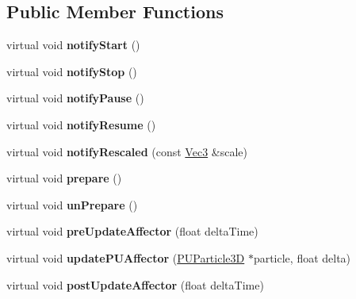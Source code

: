 \subsection*{Public Member Functions}
\begin{DoxyCompactItemize}
\item 
\mbox{\label{classPUAffector_ac9a6b7facaa01a91682c7f5ef2640e29}} 
virtual void {\bfseries notify\+Start} ()
\item 
\mbox{\label{classPUAffector_a51f2131b9362906ff5366829770f67cf}} 
virtual void {\bfseries notify\+Stop} ()
\item 
\mbox{\label{classPUAffector_a7ae731a4d20c1f77d392e43bc8088d9f}} 
virtual void {\bfseries notify\+Pause} ()
\item 
\mbox{\label{classPUAffector_a99c9fd92a41dfc482662f64ce098e12d}} 
virtual void {\bfseries notify\+Resume} ()
\item 
\mbox{\label{classPUAffector_afabb5c0d7f00b04e5b396bde8e438a30}} 
virtual void {\bfseries notify\+Rescaled} (const \hyperlink{classVec3}{Vec3} \&scale)
\item 
\mbox{\label{classPUAffector_ad07ffbda0b3401cae887c906c49f6d01}} 
virtual void {\bfseries prepare} ()
\item 
\mbox{\label{classPUAffector_adda4fa4447bda704cac3f3294249154e}} 
virtual void {\bfseries un\+Prepare} ()
\item 
\mbox{\label{classPUAffector_a781cd489b543f6275822d1fc08d87f09}} 
virtual void {\bfseries pre\+Update\+Affector} (float delta\+Time)
\item 
\mbox{\label{classPUAffector_a8a4e6886f9a3d6a4a803e8cade9ff50a}} 
virtual void {\bfseries update\+P\+U\+Affector} (\hyperlink{structPUParticle3D}{P\+U\+Particle3D} $\ast$particle, float delta)
\item 
\mbox{\label{classPUAffector_a80be018251b28ee9955ed499751350b9}} 
virtual void {\bfseries post\+Update\+Affector} (float delta\+Time)

\end{DoxyCompactItemize}
